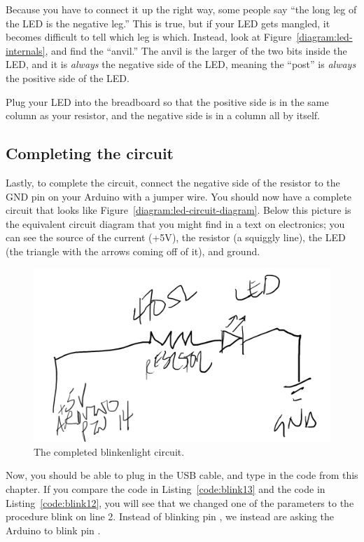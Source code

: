 Because you have to connect it up the right way, some people say ``the long leg of the LED is the negative leg.'' This is true, but if your LED gets mangled, it becomes difficult to tell which leg is which. Instead, look at Figure~\vref{diagram:led-internals}, and find the ``anvil.'' The anvil is the larger of the two bits inside the LED, and it is {\em always} the negative side of the LED, meaning the ``post'' is {\em always} the positive side of the LED.

Plug your LED into the breadboard so that the positive side is in the same column as your resistor, and the negative side is in a column all by itself.

\subsection{Completing the circuit}
Lastly, to complete the circuit, connect the negative side of the resistor to the {\code GND} pin on your Arduino with a jumper wire. You should now have a complete circuit that looks like Figure~\vref{diagram:led-circuit-diagram}. Below this picture is the equivalent circuit diagram that you might find in a text on electronics; you can see the source of the current ({\code +5V}), the resistor (a squiggly line), the LED (the triangle with the arrows coming off of it), and ground. 

\begin{figure}[ht]
  \begin{center}
    \includegraphics[width=0.8\linewidth]{images/ch2-led-circuit-diagram}
    \caption{The completed blinkenlight circuit.}
    \label{diagram:ch2-led-circuit-diagram}
  \end{center}
\end{figure}

Now, you should be able to plug in the USB cable, and type in the code from this chapter. If you compare the code in Listing~\vref{code:blink13} and the code in Listing~\vref{code:blink12}, you will see that we changed  one of the parameters to the procedure {\procname blink} on line 2. Instead of blinking pin {}, we instead are asking the Arduino to blink pin {}.

